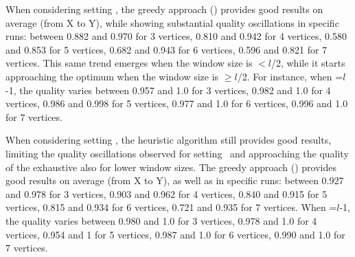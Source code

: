 When considering setting \wide, the greedy approach () provides good results on average (from X to Y), while showing substantial quality oscillations in specific runs: between 0.882 and 0.970 for 3 vertices, 0.810 and 0.942 for 4 vertices, 0.580 and 0.853 for 5 vertices, 0.682 and 0.943 for 6 vertices, 0.596 and 0.821 for 7 vertices. This same trend emerges when the window size is $<$$l$/2, while it starts approaching the optimum when the window size is $\geq$$l$/2. For instance, when \windowsize=$l$-1, the quality varies between 0.957 and 1.0 for 3 vertices, 0.982 and 1.0 for 4 vertices, 0.986 and 0.998 for 5 vertices, 0.977 and 1.0 for 6 vertices, 0.996 and 1.0 for 7 vertices.

When considering setting \average, the heuristic algorithm still provides good results, limiting the quality oscillations observed for setting \wide\ and approaching the quality of the exhaustive also for lower window sizes. The greedy approach () provides good results on average (from X to Y), as well as in specific runs: between 0.927 and 0.978 for 3 vertices, 0.903 and 0.962 for 4 vertices, 0.840 and 0.915 for 5 vertices, 0.815 and 0.934 for 6 vertices, 0.721 and 0.935 for 7 vertices. 
When \windowsize=$l$-1, the quality varies between 0.980 and 1.0 for 3 vertices, 0.978 and 1.0 for 4 vertices, 0.954 and 1 for 5 vertices, 0.987 and 1.0 for 6 vertices, 0.990 and 1.0 for 7 vertices.

